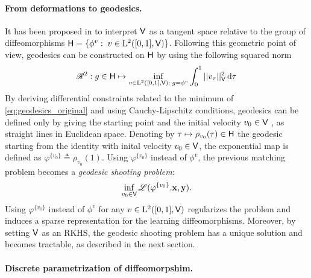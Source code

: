 \vspace{-1ex}
\paragraph{From deformations to geodesics.}
It has been proposed in \cite{miller2006geodesic} to interpret $\mathsf{V}$ as a tangent space relative to the group of diffeomorphisms $\mathsf{H}=\{ \phi^v:\; v\in \mathrm{L}^2([0,1],\mathsf{V})\}$. Following this geometric point of view, geodesics can be constructed on $\mathsf{H}$ by using the following squared norm 
\begin{equation}
  \label{eq:geodesics_original}
  \mathscr{R}^2: g\in \mathsf{H}\mapsto \inf_{ v\in \mathrm{L}^2([0,1],\mathsf{V}):\; g=\phi^v} \int_0^1 || v_\tau||_{\mathsf{V}}^2\mathop{}\!\mathrm{d} \tau
\end{equation}
By deriving differential constraints related to the minimum of \eqref{eq:geodesics_original} and using Cauchy-Lipschitz conditions, geodesics can be defined only by giving the starting point and the initial velocity $v_0\in \mathsf{V}$ \cite{miller2006geodesic}, as straight lines in Euclidean space. Denoting by $\tau \mapsto \rho_{v_0}(\tau)\in\mathsf{H}$ the geodesic starting from the identity with inital velocity $v_0\in \mathsf{V}$, the exponential map is defined as $\varphi^{\{v_0\}}\triangleq \rho_{v_0}(1)$. Using $\varphi^{\{v_0\}}$ instead of $\phi^v$, the previous matching problem becomes a \textit{geodesic shooting problem}:
\begin{equation}
  \label{eq:geodesics_shooting}
  \inf_{v_0 \in \mathsf{V}} \mathscr{L}(\varphi^{\{v_0\}}.\mathbf{x},\mathbf{y}).
\end{equation}
Using $\varphi^{\{v_0\}}$ instead of $\phi^v$ for any $v\in \mathrm{L}^2([0,1],\mathsf{V})$ regularizes the problem and induces a sparse representation for the learning diffeomorphisms. Moreover, by setting $\mathsf{V}$ as an RKHS, the geodesic shooting problem has a unique solution and becomes tractable, as described in the next section.

\vspace{-1ex}
\paragraph{Discrete parametrization of diffeomorpshim.}


